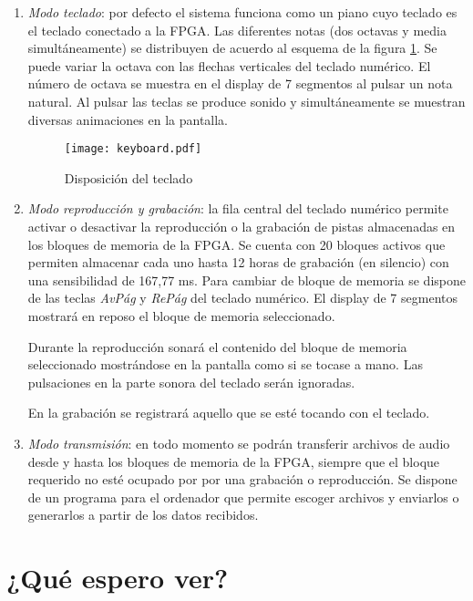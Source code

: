 \documentclass{article}
\begin{document}
	\begin{enumerate}
		\item {\itshape Modo teclado}: por defecto el sistema funciona como un piano cuyo teclado es el teclado conectado a la FPGA. Las diferentes notas (dos octavas y media simultáneamente) se distribuyen de acuerdo al esquema de la figura \ref{fig:teclado}. Se puede variar la octava con las flechas verticales del teclado numérico. El número de octava se muestra en el display de 7 segmentos al pulsar un nota natural. Al pulsar las teclas se produce sonido y simultáneamente se muestran diversas animaciones en la pantalla.

\begin{figure}[ht] \centering
	\texttt{[image: keyboard.pdf]}

	\caption{Disposición del teclado}
	\label{fig:teclado}
\end{figure}

	\item {\itshape Modo reproducción y grabación}: la fila central del teclado numérico permite activar o desactivar la reproducción o la grabación de pistas almacenadas en los bloques de memoria de la FPGA. Se cuenta con 20 bloques activos que permiten almacenar cada uno hasta 12 horas de grabación (en silencio) con una sensibilidad de 167,77 ms. Para cambiar de bloque de memoria se dispone de las teclas {\itshape AvPág} y {\itshape RePág} del teclado numérico. El display de 7 segmentos mostrará en reposo el bloque de memoria seleccionado.

		Durante la reproducción sonará el contenido del bloque de memoria seleccionado mostrándose en la pantalla como si se tocase a mano. Las pulsaciones en la parte sonora del teclado serán ignoradas.

		En la grabación se registrará aquello que se esté tocando con el teclado.

	\item {\itshape Modo transmisión}: en todo momento se podrán transferir archivos de audio desde y hasta los bloques de memoria de la FPGA, siempre que el bloque requerido no esté ocupado por por una grabación o reproducción. Se dispone de un programa para el ordenador que permite escoger archivos y enviarlos o generarlos a partir de los datos recibidos.

	\end{enumerate}
\section{¿Qué espero ver?}
\end{document}
